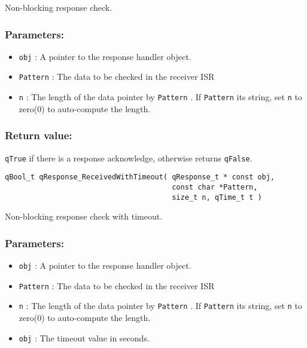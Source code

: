 Non-blocking response check. 

\subsubsection*{Parameters:}
\begin{itemize}
    \item \lstinline{obj} : A pointer to the response handler object.
    \item \lstinline{Pattern} : The data to be checked in the receiver ISR
    \item \lstinline{n} : The length of the data pointer by \lstinline{Pattern} . If \lstinline{Pattern} its string, set \lstinline{n} to zero(0) to auto-compute the length.
\end{itemize}

\subsubsection*{Return value:}
\lstinline{qTrue} if there is a response acknowledge, otherwise returns \lstinline{qFalse}.

\noindent\hrulefill

\begin{lstlisting}[style=CStyle]
qBool_t qResponse_ReceivedWithTimeout( qResponse_t * const obj, 
                                       const char *Pattern, 
                                       size_t n, qTime_t t )
\end{lstlisting}

Non-blocking response check with timeout. 

\subsubsection*{Parameters:}
\begin{itemize}
    \item \lstinline{obj} : A pointer to the response handler object.
    \item \lstinline{Pattern} : The data to be checked in the receiver ISR
    \item \lstinline{n} : The length of the data pointer by \lstinline{Pattern} . If \lstinline{Pattern} its string, set \lstinline{n} to zero(0) to auto-compute the length.
    \item \lstinline{obj} : The timeout value in seconds.
\end{itemize}

